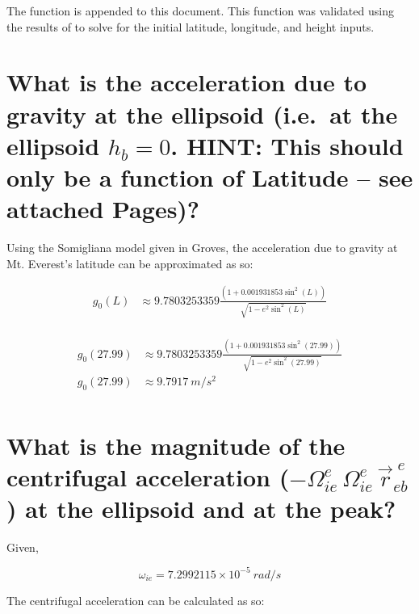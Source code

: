 \begin{parts}
    \solution
    The function  is appended to this document. This function was validated using the results of  to solve for the initial latitude, longitude, and height inputs.

    \part{What is the acceleration due to gravity at the ellipsoid (i.e.\ at the ellipsoid $h_b = 0$. HINT: This should only be a function of Latitude -- see attached Pages)?}

    \solution
    Using the Somigliana model given in Groves, the acceleration due to gravity at Mt. Everest's latitude can be approximated as so:

    \begin{equation}
        \begin{split}
            g_0(L) & \approx 9.7803253359\frac{(1 + 0.001931853 \sin^2(L))}{\sqrt{1 - e^2\sin^2(L)}} \\
        \end{split}
    \end{equation}

    \begin{equation*}
        \begin{split}
            g_0(27.99) & \approx 9.7803253359\frac{(1 + 0.001931853 \sin^2(27.99))}{\sqrt{1 - e^2\sin^2(27.99)}} \\
            g_0(27.99) & \approx 9.7917~\unit{m/s^2}\\
        \end{split}
    \end{equation*}

    \part{What is the magnitude of the centrifugal acceleration ($-\Omega^{e}_{ie}\,\Omega^{e}_{ie}\,\vec{r}^{\;e}_{eb}$) at the ellipsoid and at the peak?}

    \solution
    Given,

    \[\omega_{ie}= 7.2992115 \times 10^{-5}~\unit{rad/s}\]

    The centrifugal acceleration can be calculated as so:


\end{parts}
